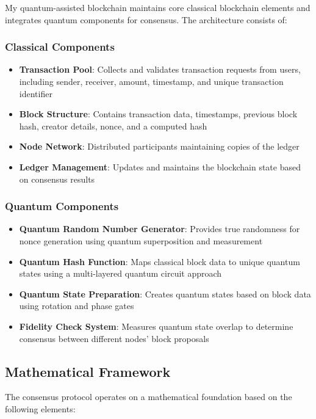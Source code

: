 \documentclass[11pt,a4paper]{article}
\begin{document}
My quantum-assisted blockchain maintains core classical blockchain elements and integrates quantum components for consensus. The architecture consists of:

\subsubsection{Classical Components}
\begin{itemize}
    \item \textbf{Transaction Pool}: Collects and validates transaction requests from users, including sender, receiver, amount, timestamp, and unique transaction identifier
    \item \textbf{Block Structure}: Contains transaction data, timestamps, previous block hash, creator details, nonce, and a computed hash
    \item \textbf{Node Network}: Distributed participants maintaining copies of the ledger
    \item \textbf{Ledger Management}: Updates and maintains the blockchain state based on consensus results
\end{itemize}

\subsubsection{Quantum Components}
\begin{itemize}
    \item \textbf{Quantum Random Number Generator}: Provides true randomness for nonce generation using quantum superposition and measurement \cite{id_quantique_qrng}
    \item \textbf{Quantum Hash Function}: Maps classical block data to unique quantum states using a multi-layered quantum circuit approach
    \item \textbf{Quantum State Preparation}: Creates quantum states based on block data using rotation and phase gates
    \item \textbf{Fidelity Check System}: Measures quantum state overlap to determine consensus between different nodes' block proposals \cite{wikipedia_fidelity}
\end{itemize}

\subsection{Mathematical Framework}
The consensus protocol operates on a mathematical foundation based on the following elements:
\end{document}
